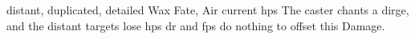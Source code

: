   {distant, duplicated, detailed}%
  {Wax}%
  {Fate, Air}%
  {current \glspl{hp}}%
  {The caster chants a dirge, and the distant targets lose  \glspl{hp}}%
  {\gls{dr} and \glspl{fp} do nothing to offset this Damage.}
